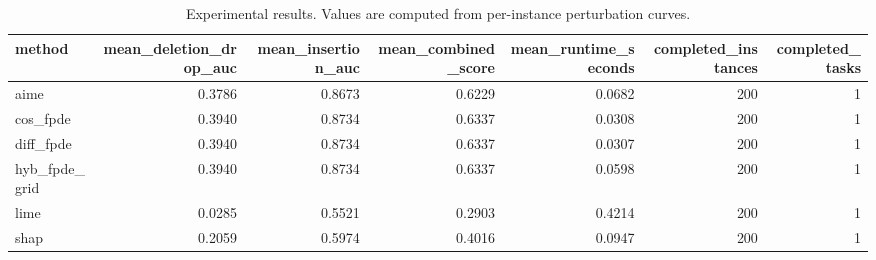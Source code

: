 \begin{table}[t]
\caption{Experimental results. Values are computed from per-instance perturbation curves.}
\label{tab:main_results_computed}
\centering
\begin{tabular}{lrrrrrr}
\toprule
method & mean\_deletion\_drop\_auc & mean\_insertion\_auc & mean\_combined\_score & mean\_runtime\_seconds & completed\_instances & completed\_tasks \\
\midrule
aime & 0.3786 & 0.8673 & 0.6229 & 0.0682 & 200 & 1 \\
cos\_fpde & 0.3940 & 0.8734 & 0.6337 & 0.0308 & 200 & 1 \\
diff\_fpde & 0.3940 & 0.8734 & 0.6337 & 0.0307 & 200 & 1 \\
hyb\_fpde\_grid & 0.3940 & 0.8734 & 0.6337 & 0.0598 & 200 & 1 \\
lime & 0.0285 & 0.5521 & 0.2903 & 0.4214 & 200 & 1 \\
shap & 0.2059 & 0.5974 & 0.4016 & 0.0947 & 200 & 1 \\
\bottomrule
\end{tabular}

\end{table}
